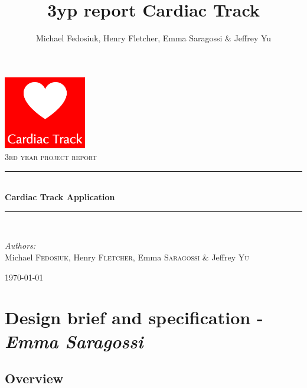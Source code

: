 \documentclass[11pt]{article}
\author{Michael Fedosiuk, Henry Fletcher, Emma Saragossi & Jeffrey Yu}
\title{3yp report Cardiac Track}
\newcommand{\HRule}{\rule{\linewidth}{0.5mm}}
\begin{document}
\begin{titlepage}
\begin{center}

\includegraphics[width=0.27\textwidth]{titleimg.png}~\\[1cm]

\textsc{\Large 3rd year project report}\\[0.5cm]

\HRule \\[0.4cm]
{ \huge \bfseries Cardiac Track Application \\[0.4cm] }

\HRule \\[1.5cm]

\begin{minipage}{0.8\textwidth}
\begin{flushleft} \large
\emph{Authors:}\\
Michael \textsc{Fedosiuk}, Henry \textsc{Fletcher}, Emma \textsc{Saragossi} \& Jeffrey \textsc{Yu}
\\
\end{flushleft}
\end{minipage}

\vfill

{\large \today}

\end{center}
\end{titlepage}

\tableofcontents

\section{Design brief and specification - \textit{Emma Saragossi}}
\subsection{Overview}
\end{document}
